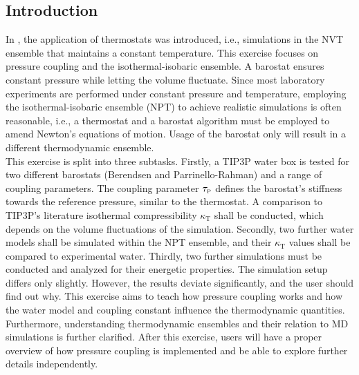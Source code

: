 \documentclass[9pt,tutorial]{livecoms}
\begin{document}
\subsection{Introduction}
In , the application of thermostats was introduced, i.e., simulations in the NVT ensemble that maintains a constant temperature. This exercise focuses on pressure coupling and the isothermal-isobaric ensemble. A barostat ensures constant pressure while letting the volume fluctuate. Since most laboratory experiments are performed under constant pressure and temperature, employing the isothermal-isobaric ensemble (NPT) to achieve realistic simulations is often reasonable, i.e., a thermostat and a barostat algorithm must be employed to amend Newton's equations of motion. Usage of the barostat only will result in a different thermodynamic ensemble.\\
This exercise is split into three subtasks. Firstly, a TIP3P water box is tested for two different barostats (Berendsen and Parrinello-Rahman) and a range of coupling parameters. The coupling parameter $\tau_\text{\tiny P}$ defines the barostat's stiffness towards the reference pressure, similar to the thermostat. A comparison to TIP3P's literature isothermal compressibility $\kappa_\text{T}$ shall be conducted, which depends on the volume fluctuations of the simulation. Secondly, two further water models shall be simulated within the NPT ensemble, and their $\kappa_\text{T}$ values shall be compared to experimental water. Thirdly, two further simulations must be conducted and analyzed for their energetic properties. The simulation setup differs only slightly. However, the results deviate significantly, and the user should find out why. This exercise aims to teach how pressure coupling works and how the water model and coupling constant influence the thermodynamic quantities. Furthermore, understanding thermodynamic ensembles and their relation to MD simulations is further clarified. After this exercise, users will have a proper overview of how pressure coupling is implemented and be able to explore further details independently. 
\end{document}
